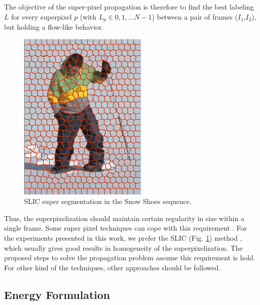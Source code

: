 \documentclass[a4paper, 10pt, conference]{ieeeconf}      %
\begin{document}
The objective of the super-pixel propagation is
therefore to find the best labeling $L$ for every superpixel $p$
(with $L_p \in {0,1,...N-1}$) between a pair
of frames ($I_{1}$,$I_{2}$), but holding a flow-like behavior.
   \begin{figure}[thpb]
      \centering
      \includegraphics[height=0.22\textheight]{images/segmentation.png}
      \caption{SLIC super segmentation in the Snow Shoes sequence.}
      \label{figurelabel_segmentation}
   \end{figure}
Thus, the superpixelization should maintain certain
regularity in size within a single frame. Some super
pixel techniques can cope with this requirement \cite{c9}\cite{c10}.
For the experiments presented in this work, we prefer
the SLIC (Fig. \ref{figurelabel_segmentation}) method \cite{c9}, which usually gives
good results in homogeneity of the superpixelization.
The proposed steps to solve the propagation problem
assume this requirement is hold. For other kind of the
techniques, other approaches should be followed.


\subsection{Energy Formulation}
\end{document}

